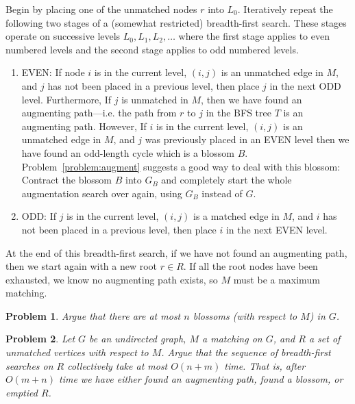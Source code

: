 \documentclass[11pt]{article}
\newtheorem{problem}{Problem}
\begin{document}
Begin by placing one of the unmatched nodes $r$ into $L_{0}$.  Iteratively repeat the following two stages of a (somewhat restricted) breadth-first search.  These stages operate on successive levels $L_{0}, L_{1}, L_{2}, \ldots$ where the first stage applies to even numbered levels and the second stage applies to odd numbered levels.

\begin{enumerate}
		
	\item EVEN:  If node $i$ is in the current level, $(i,j)$ is an unmatched edge in $M$, and $j$ has not been placed in a previous level, then place $j$ in the next ODD level.  Furthermore, If $j$ is unmatched in $M$, then we have found an augmenting path---i.e. the path from $r$ to $j$ in the BFS tree $T$ is an augmenting path.  However, If $i$ is in the current level, $(i,j)$ is an unmatched edge in $M$, and $j$ was previously placed in an EVEN level then we have found an odd-length cycle which is a blossom $B$.  Problem~\ref{problem:augment} suggests a good way to deal with this blossom:  Contract the blossom $B$ into $G_{B}$ and completely start the whole augmentation search over again, using $G_{B}$ instead of $G$.
		
	\item ODD:  If $j$ is in the current level, $(i,j)$ is a matched edge in $M$, and $i$ has not been placed in a previous level, then place $i$ in the next EVEN level.
		
\end{enumerate}

At the end of this breadth-first search, if we have not found an augmenting path, then we start again with a new root $r \in R$.  If all the root nodes have been exhausted, we know no augmenting path exists, so $M$ must be a maximum matching.  

\begin{problem}
Argue that there are at most $n$ blossoms (with respect to $M$) in $G$.
\end{problem}

\begin{problem}
Let $G$ be an undirected graph, $M$ a matching on $G$, and $R$ a set of unmatched vertices with respect to $M$.  Argue that the sequence of breadth-first searches on $R$ collectively take at most $O(n+m)$ time.  That is, after $O(m+n)$ time we have either found an augmenting path, found a blossom, or emptied $R$.
\end{problem}
\end{document}

